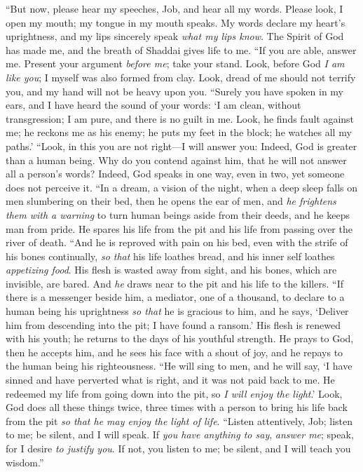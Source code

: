 \begin{biblechapter} %
 “But now, please hear my speeches, Job, 
and hear all my words.
\verse Please look, I open my mouth; 
my tongue in my mouth speaks.
\verse My words declare my heart’s uprightness, 
and my lips sincerely speak \textit{what my lips know}.
\verse The Spirit of God has made me, 
and the breath of Shaddai gives life to me.
\verse “If you are able, answer me. 
Present your argument \textit{before me}; take your stand.
\verse Look, before God \textit{I am like you}; 
I myself was also formed from clay.
\verse Look, dread of me should not terrify you, 
and my hand will not be heavy upon you.
\verse “Surely you have spoken in my ears, 
and I have heard the sound of your words:
\verse ‘I am clean, without transgression; 
I am pure, and there is no guilt in me.
\verse Look, he finds fault against me; 
he reckons me as his enemy;
\verse he puts my feet in the block; 
he watches all my paths.’
\verse “Look, in this you are not right—I will answer you: 
Indeed, God is greater than a human being.
\verse Why do you contend against him, 
that he will not answer all a person’s words?
\verse Indeed, God speaks in one way, 
even in two, yet someone does not perceive it.
\verse “In a dream, a vision of the night, 
when a deep sleep falls on men slumbering on their bed,
\verse then he opens the ear of men, 
and \textit{he frightens them with a warning}
\verse to turn human beings aside from their deeds, 
and he keeps man from pride.
\verse He spares his life from the pit 
and his life from passing over the river of death.
\verse “And he is reproved with pain on his bed, 
even with the strife of his bones continually,
\verse \textit{so that} his life loathes bread, 
and his inner self loathes \textit{appetizing food}.
\verse His flesh is wasted away from sight, 
and his bones, which are invisible, are bared.
\verse And \textit{he} draws near to the pit 
and his life to the killers.
\verse “If there is a messenger beside him, a mediator, one of a thousand, 
to declare to a human being his uprightness
\verse \textit{so that} he is gracious to him, and he says, 
‘Deliver him from descending into the pit; 
I have found a ransom.’
\verse His flesh is renewed with his youth; 
he returns to the days of his youthful strength.
\verse He prays to God, then he accepts him, 
and he sees his face with a shout of joy, 
and he repays to the human being his righteousness.
\verse “He will sing to men, and he will say, 
‘I have sinned and have perverted what is right, 
and it was not paid back to me.
\verse He redeemed my life from going down into the pit, 
so \textit{I will enjoy the light}.’
\verse Look, God does all these things 
twice, three times with a person
\verse to bring his life back from the pit 
\textit{so that he may enjoy the light of life}.
\verse “Listen attentively, Job; listen to me; 
be silent, and I will speak.
\verse If \textit{you have anything to say}, \textit{answer me}; 
speak, for I desire \textit{to justify you}.
\verse If not, you listen to me; 
be silent, and I will teach you wisdom.”
\end{biblechapter}


